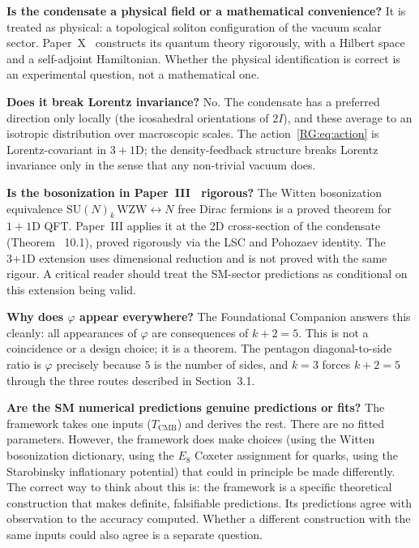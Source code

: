 \documentclass[11pt,a4paper]{article}
\newcommand{\vp}{\varphi}
\newcommand{\twoI}{2I}
\newcommand{\TCMB}{T_{\mathrm{CMB}}}
\begin{document}
\textbf{Is the condensate a physical field or a mathematical convenience?}
It is treated as physical: a topological soliton configuration of the vacuum
scalar sector. Paper~X~\cite{Paper10} constructs its quantum theory rigorously, with a Hilbert
space and a self-adjoint Hamiltonian. Whether the physical identification is
correct is an experimental question, not a mathematical one.

\textbf{Does it break Lorentz invariance?}
No. The condensate has a preferred direction only locally (the icosahedral
orientations of $\twoI$), and these average to an isotropic distribution
over macroscopic scales. The action~\eqref{RG:eq:action} is Lorentz-covariant
in $3+1$D; the density-feedback structure breaks Lorentz invariance only
in the sense that any non-trivial vacuum does.

\textbf{Is the bosonization in Paper~III~\cite{Paper3} rigorous?}
The Witten bosonization equivalence $\mathrm{SU}(N)_k\,\mathrm{WZW}
\leftrightarrow N$ free Dirac fermions is a proved theorem for $1+1$D QFT.
Paper~III applies it at the 2D cross-section of the condensate (Theorem
~10.1), proved rigorously via the LSC and Pohozaev identity.
The 3+1D extension uses dimensional reduction and is not proved with the same
rigour. A critical reader should treat the SM-sector predictions as conditional
on this extension being valid.

\textbf{Why does $\vp$ appear everywhere?}
The Foundational Companion answers this cleanly: all appearances of $\vp$
are consequences of $k+2=5$. This is not a coincidence or a design choice;
it is a theorem. The pentagon diagonal-to-side ratio is $\vp$ precisely
because $5$ is the number of sides, and $k=3$ forces $k+2=5$ through the
three routes described in Section~3.1.

\textbf{Are the SM numerical predictions genuine predictions or fits?}
The framework takes one inputs ($\TCMB$) and derives the rest.
There are no fitted parameters. However, the framework does make choices
(using the Witten bosonization dictionary, using the $E_8$ Coxeter assignment
for quarks, using the Starobinsky inflationary potential) that could in
principle be made differently. The correct way to think about this is:
the framework is a specific theoretical construction that makes definite,
falsifiable predictions. Its predictions agree with observation to the
accuracy computed. Whether a different construction with the same inputs
could also agree is a separate question.
\end{document}
